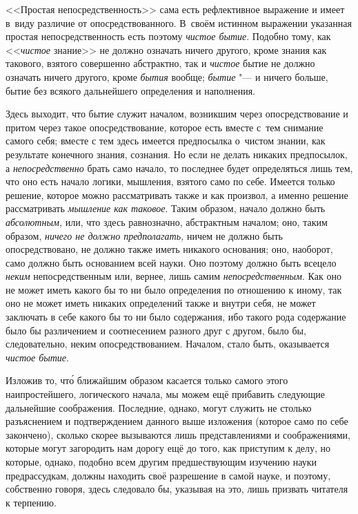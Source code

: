 <<Простая непосредственность>> сама есть рефлективное выражение и имеет в~виду
различие от опосредствованного. В~своём истинном выражении указанная простая
непосредственность есть поэтому {\em чистое бытие}. Подобно тому, как
<<{\em чистое} знание>> не должно означать ничего другого, кроме знания как
такового, взятого совершенно абстрактно, так и {\em чистое} бытие не должно
означать ничего другого, кроме {\em бытия} вообще; {\em бытие} "--- и ничего
больше, бытие без всякого дальнейшего определения и наполнения.

Здесь выходит, что бытие служит началом, возникшим через опосредствование и
притом через такое опосредствование, которое есть вместе с~тем снимание
самого себя; вместе с тем здесь имеется предпосылка о~чистом знании, как
результате конечного знания, сознания. Но если не делать никаких
предпосылок, а {\em непосредственно} брать само начало,
то последнее будет определяться лишь тем, что оно есть начало логики,
мышления, взятого само по себе. Имеется только решение, которое можно
рассматривать также и как произвол, а именно решение рассматривать
{\em мышление как таковое}. Таким образом, начало должно
быть {\em абсолютным,} или, что здесь равнозначно,
абстрактным началом; оно, таким образом, {\em ничего не должно предполагать,}
ничем не должно быть опосредствовано, не должно также
иметь никакого основания; оно, наоборот, само должно быть основанием всей
науки. Оно поэтому должно быть всецело {\em неким} непосредственным или,
вернее, лишь самим {\em непосредственным}. Как оно не может иметь какого
бы то ни было определения по отношению к иному, так оно не может иметь
никаких определений также и внутри себя, не может заключать в себе какого
бы то ни было содержания, ибо такого рода содержание было бы различением и
соотнесением разного друг с другом, было бы, следовательно, неким
опосредствованием. Началом, стало быть, оказывается {\em чистое бытие}.

Изложив то, чт\'{о} ближайшим образом касается только самого этого
наипростейшего, логического начала, мы можем ещё прибавить следующие дальнейшие
соображения. Последние, однако, могут служить не столько разъяснением и
подтверждением данного выше изложения (которое само по себе закончено), сколько
скорее вызываются лишь представлениями и соображениями, которые могут
загородить нам дорогу ещё до того, как приступим к делу, но которые, однако,
подобно всем другим предшествующим изучению науки предрассудкам, должны
находить своё разрешение в самой науке, и поэтому, собственно говоря, здесь
следовало бы, указывая на это, лишь призвать читателя к терпению.

